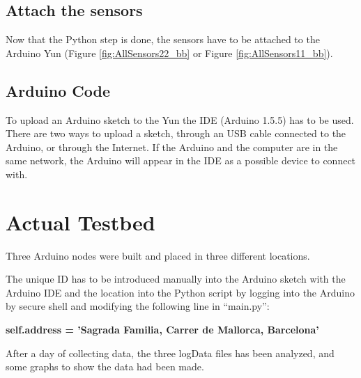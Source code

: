 \documentclass[12pt, a4paper,twoside]{tesi_upf}
\begin{document}
  \subsection{Attach the sensors}
    Now that the Python step is done, the sensors have to be attached to the Arduino Yun (Figure \ref{fig:AllSensors22_bb} or Figure \ref{fig:AllSensors11_bb}).
  
  \subsection{Arduino Code}
    To upload an Arduino sketch to the Yun the IDE (Arduino 1.5.5) has to be used. There are two ways to upload a sketch, through an USB cable connected to the Arduino, or through the Internet. If the Arduino and the computer are in the same network, the Arduino will appear in the IDE as a possible device to connect with.
  
  \section{Actual Testbed}
    Three Arduino nodes were built and placed in three different locations.
    
    The unique ID has to be introduced manually into the Arduino sketch with the Arduino IDE and the location into the Python script by logging into the Arduino by secure shell and modifying the following line in ``main.py'':
    
    {\begin{centering} \textbf{self.address = 'Sagrada Familia, Carrer de Mallorca, Barcelona'}\par \end{centering}}
    
    After a day of collecting data, the three logData files has been analyzed, and some graphs to show the data had been made.
    
\end{document}
